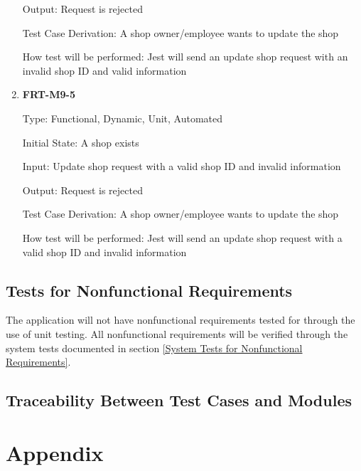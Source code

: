 \documentclass[12pt, titlepage]{article}
\begin{document}
\begin{enumerate}
	      Output: Request is rejected

	      Test Case Derivation: A shop owner/employee wants to update the shop

	      How test will be performed: Jest will send an update shop request with an invalid shop ID and valid
	      information

	\item \textbf{FRT-M9-5}

	      Type: Functional, Dynamic, Unit, Automated

	      Initial State: A shop exists

	      Input: Update shop request with a valid shop ID and invalid information

	      Output: Request is rejected

	      Test Case Derivation: A shop owner/employee wants to update the shop

	      How test will be performed: Jest will send an update shop request with a valid shop ID and invalid
	      information

\end{enumerate}

\subsection{Tests for Nonfunctional Requirements}

The application will not have nonfunctional requirements tested for through the use of unit
testing. All nonfunctional requirements will be verified through the system tests documented in
section \ref{System Tests for Nonfunctional Requirements}.

\subsection{Traceability Between Test Cases and Modules}






\newpage

\section{Appendix}

\end{document}
